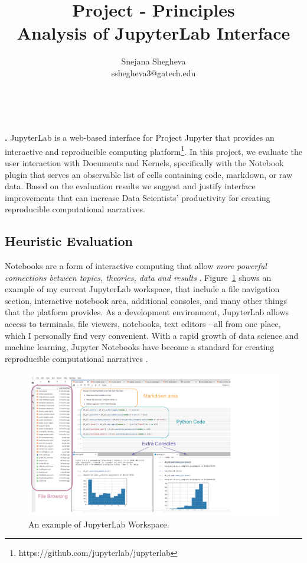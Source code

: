 \documentclass[12pt,letterpaper]{article}
\makeatletter
\renewcommand{\maketitle}{\bgroup
   \begin{center}
   \textbf{{\fontsize{18pt}{20}\selectfont \@title}}\\
   \vspace{10pt}
   {\fontsize{12pt}{0}\selectfont \@author} 
   \end{center}
}
\newenvironment{myquote}[1]%
  {\list{}{\leftmargin=#1\rightmargin=#1}\item[]}%
  {\endlist}
\renewenvironment{abstract}
{\vspace*{-.5in}\fontsize{12pt}{12}\begin{myquote}{.5in}
\noindent \par{\bfseries \abstractname.}}
{\medskip\noindent
\end{myquote}
}
\makeatother
\begin{document}
\title{Project - Principles\\Analysis of JupyterLab Interface}
\author{Snejana Shegheva \\ sshegheva3@gatech.edu}

\maketitle
\thispagestyle{fancy}

\begin{abstract}
JupyterLab is a web-based interface for Project Jupyter that provides an interactive and reproducible computing platform\footnote{https://github.com/jupyterlab/jupyterlab}. In this project, we evaluate the user interaction with Documents and Kernels, specifically with the Notebook plugin that serves an observable list of cells containing code, markdown, or raw data. Based on the evaluation results we suggest and justify interface improvements that can increase Data Scientists' productivity for creating reproducible computational narratives.
\end{abstract}

\subsection*{Heuristic Evaluation}
Notebooks are a form of interactive computing that allow \textit{more powerful connections between topics, theories, data and results} \cite{perkel2018jupyter}. Figure~\ref{fig::1} shows an example of my current JupyterLab workspace, that include a file navigation section, interactive notebook area, additional consoles, and many other things that the platform provides. As a development environment, JupyterLab allows access to terminals, file viewers, notebooks, text editors - all from one place, which I personally find very convenient. With a rapid growth of data science and machine learning, Jupyter Notebooks have become a standard for creating reproducible computational narratives \cite{perkel2018jupyter}. 

\begin{figure}[h]
\centering
\includegraphics[scale=.5]{figures/project-principles/jupyter.png}
\caption{An example of JupyterLab Workspace.}
\label{fig::1}
\end{figure}
\end{document}
